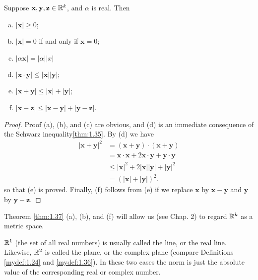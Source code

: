 \begin{thm}\label{thm:1.37}
    Suppose $\mathbf{x}, \mathbf{y}, \mathbf{z}\in{\protect\mathbb R}^k$, and $\alpha$ is real. Then
    \begin{enumerate}[(a)]
        \item $| \mathbf{x}| \geq 0$;
        \item $| \mathbf{x}| = 0$ if and only if $\mathbf{x} =0$;
        \item $| \alpha \mathbf{x}| = | \alpha||x|$
        \item $|\mathbf{x}\cdot\mathbf{y}| \leq  |\mathbf{x}| | \mathbf{y}|$;
        \item $|\mathbf{x}+\mathbf{y}| \leq | \mathbf{x} | + | \mathbf{y}|$;
        \item $|\mathbf{x}-\mathbf{z}| \leq |\mathbf{x}-\mathbf{y}| + |\mathbf{y}-\mathbf{z}|$.
    \end{enumerate}
\end{thm}


\begin{proof}
    Proof (a), (b), and (c) are obvious, and (d) is an immediate consequence of the Schwarz inequality\ref{thm:1.35}. 
    By (d) we have 
    \begin{align*}
        |\mathbf{x} + \mathbf{y}|^2
        &= (\mathbf{x} + \mathbf{y}) \cdot (\mathbf{x} + \mathbf{y})\\
        &= \mathbf{x} \cdot \mathbf{x} + 2\mathbf{x} \cdot \mathbf{y} + \mathbf{y} \cdot \mathbf{y}\\
        &\leq |\mathbf{x}|^2 + 2|\mathbf{x}||\mathbf{y}| + |\mathbf{y}|^2\\
        &= \left(|\mathbf{x}| + |\mathbf{y}|\right)^2.
    \end{align*}
    so that (e) is proved. Finally, 
    (f) follows from (e) if we 
    replace $\mathbf{x}$ by $\mathbf{x}-\mathbf{y}$ 
    and $\mathbf{y}$ by $\mathbf{y}-\mathbf{z}$.
\end{proof}

\begin{myRemark}
    \label{myRemark:1.38}
    Theorem \ref{thm:1.37} (a), (b), and (f) will allow us (see Chap. 2) to
    regard ${\protect\mathbb R}^k$ as a metric space.
    
    ${\protect\mathbb R}^1$ (the set of all real numbers) is usually called the line, 
    or the real line. 
    Likewise, ${\protect\mathbb R}^2$ is called the plane, or the complex plane (compare Definitions \ref{mydef:1.24} and \ref{mydef:1.36}). 
    In these two cases the norm is just the absolute value of the corresponding real or complex number. 
\end{myRemark}
